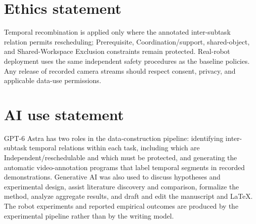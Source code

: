 \documentclass{article}
\begin{document}
\section*{Ethics statement}
Temporal recombination is applied only where the annotated inter-subtask relation permits rescheduling; Prerequisite, Coordination/support, shared-object, and Shared-Workspace Exclusion constraints remain protected. Real-robot deployment uses the same independent safety procedures as the baseline policies. Any release of recorded camera streams should respect consent, privacy, and applicable data-use permissions.

\section*{AI use statement}
GPT-6 Astra has two roles in the data-construction pipeline: identifying inter-subtask temporal relations within each task, including which are Independent/reschedulable and which must be protected, and generating the automatic video-annotation programs that label temporal segments in recorded demonstrations. Generative AI was also used to discuss hypotheses and experimental design, assist literature discovery and comparison, formalize the method, analyze aggregate results, and draft and edit the manuscript and LaTeX. The robot experiments and reported empirical outcomes are produced by the experimental pipeline rather than by the writing model.



\clearpage
\appendix

\end{document}
